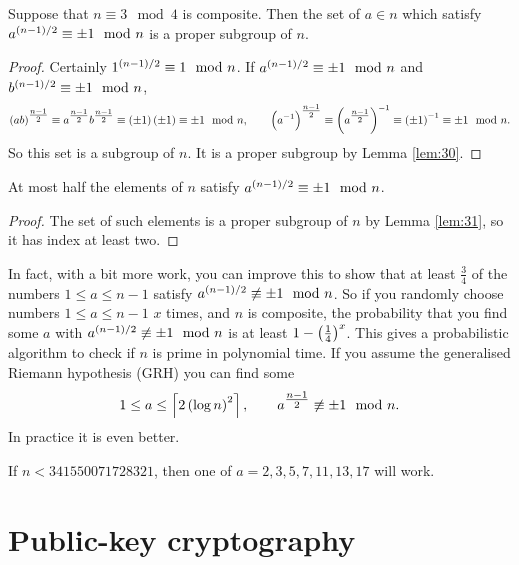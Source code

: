 \begin{lemma}
\label{lem:31}
Suppose that $ n \equiv 3 \mod 4 $ is composite. Then the set of $ a \in \unit{n} $ which satisfy $ a^{\br{n - 1} / 2} \equiv \pm 1 \mod n $ is a proper subgroup of $ \unit{n} $.
\end{lemma}

\begin{proof}
Certainly $ 1^{\br{n - 1} / 2} \equiv 1 \mod n $. If $ a^{\br{n - 1} / 2} \equiv \pm 1 \mod n $ and $ b^{\br{n - 1} / 2} \equiv \pm 1 \mod n $,
$$ \br{ab}^{\tfrac{n - 1}{2}} \equiv a^{\tfrac{n - 1}{2}}b^{\tfrac{n - 1}{2}} \equiv \br{\pm 1}\br{\pm 1} \equiv \pm 1 \mod n, \qquad \br{a^{-1}}^{\tfrac{n - 1}{2}} \equiv \br{a^{\tfrac{n - 1}{2}}}^{-1} \equiv \br{\pm 1}^{-1} \equiv \pm 1 \mod n. $$
So this set is a subgroup of $ \unit{n} $. It is a proper subgroup by Lemma \ref{lem:30}.
\end{proof}

\begin{corollary}
At most half the elements of $ \unit{n} $ satisfy $ a^{\br{n - 1} / 2} \equiv \pm 1 \mod n $.
\end{corollary}

\begin{proof}
The set of such elements is a proper subgroup of $ \unit{n} $ by Lemma \ref{lem:31}, so it has index at least two.
\end{proof}

In fact, with a bit more work, you can improve this to show that at least $ \tfrac{3}{4} $ of the numbers $ 1 \le a \le n - 1 $ satisfy $ a^{\br{n - 1} / 2} \not\equiv \pm 1 \mod n $. So if you randomly choose numbers $ 1 \le a \le n - 1 $ $ x $ times, and $ n $ is composite, the probability that you find some $ a $ with $ a^{\br{n - 1} / 2} \not\equiv \pm 1 \mod n $ is at least $ 1 - \br{\tfrac{1}{4}}^x $. This gives a probabilistic algorithm to check if $ n $ is prime in polynomial time. If you assume the generalised Riemann hypothesis (GRH) you can find some
$$ 1 \le a \le \left\lceil 2 \br{\log n}^2 \right\rceil, \qquad a^{\tfrac{n - 1}{2}} \not\equiv \pm 1 \mod n. $$
In practice it is even better.

\begin{example*}
If $ n < 341550071728321 $, then one of $ a = 2, 3, 5, 7, 11, 13, 17 $ will work.
\end{example*}

\pagebreak

\section{Public-key cryptography}

